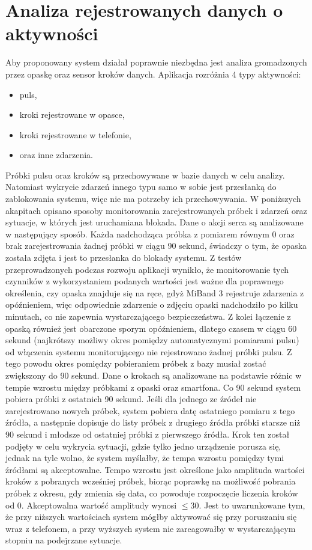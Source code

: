 \section{Analiza rejestrowanych danych o aktywności}
Aby proponowany system działał poprawnie niezbędna jest analiza gromadzonych przez opaskę oraz sensor kroków danych. Aplikacja rozróżnia 4 typy aktywności:
\begin{itemize}
    \item puls,
    \item kroki rejestrowane w opasce,
    \item kroki rejestrowane w telefonie,
    \item oraz inne zdarzenia.
\end{itemize}
Próbki pulsu oraz kroków są przechowywane w bazie danych w celu analizy. Natomiast wykrycie zdarzeń innego typu samo w sobie jest przesłanką do zablokowania systemu, więc nie ma potrzeby ich przechowywania. W poniższych akapitach opisano sposoby monitorowania zarejestrowanych próbek i zdarzeń oraz sytuacje, w których jest uruchamiana blokada.
\newline\newline
\indent Dane o akcji serca są analizowane w następujący sposób. Każda nadchodząca próbka z pomiarem równym 0 oraz brak zarejestrowania żadnej próbki w ciągu 90 sekund, świadczy o tym, że opaska została zdjęta i jest to przesłanka do blokady systemu. Z testów przeprowadzonych podczas rozwoju aplikacji wynikło, że monitorowanie tych czynników z wykorzystaniem podanych wartości jest ważne dla poprawnego określenia, czy opaska znajduje się na ręce, gdyż MiBand 3 rejestruje zdarzenia z opóźnieniem, więc odpowiednie zdarzenie o zdjęciu opaski nadchodziło po kilku minutach, co nie zapewnia wystarczającego bezpieczeństwa. Z kolei łączenie z opaską również jest obarczone sporym opóźnieniem, dlatego czasem w ciągu 60 sekund (najkrótszy możliwy okres pomiędzy automatycznymi pomiarami pulsu) od włączenia systemu monitorującego nie rejestrowano żadnej próbki pulsu. Z tego powodu okres pomiędzy pobieraniem próbek z bazy musiał zostać zwiększony do 90 sekund.
\newline\newline
\indent Dane o krokach są analizowane na podstawie różnic w tempie wzrostu między próbkami z opaski oraz smartfona. Co 90 sekund system pobiera próbki z ostatnich 90 sekund. Jeśli dla jednego ze źródeł nie zarejestrowano nowych próbek, system pobiera datę ostatniego pomiaru z tego źródła, a następnie dopisuje do listy próbek z drugiego źródła próbki starsze niż 90 sekund i młodsze od ostatniej próbki z pierwszego źródła. Krok ten został podjęty w celu wykrycia sytuacji, gdzie tylko jedno urządzenie porusza się, jednak na tyle wolno, że system myślałby, że tempa wzrostu pomiędzy tymi źródłami są akceptowalne. Tempo wzrostu jest określone jako amplituda wartości kroków z pobranych wcześniej próbek, biorąc poprawkę na możliwość pobrania próbek z okresu, gdy zmienia się data, co powoduje rozpoczęcie liczenia kroków od 0. Akceptowalna wartość amplitudy wynosi $\leq 30$. Jest to uwarunkowane tym, że przy niższych wartościach system mógłby aktywować się przy poruszaniu się wraz z telefonem, a przy wyższych system nie zareagowałby w wystarczającym stopniu na podejrzane sytuacje.
